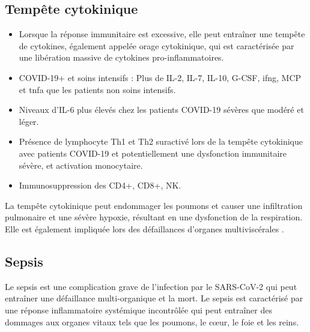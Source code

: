 \documentclass[
  a4paper,
  DIV=11,
  numbers=noendperiod,
  listof=totoc]{scrreprt}
\providecommand{\tightlist}{%
  \setlength{\itemsep}{0pt}\setlength{\parskip}{0pt}}\usepackage{longtable,booktabs,array}
\begin{document}
\subsection{Tempête cytokinique}\label{tempuxeate-cytokinique}

\begin{itemize}
\tightlist
\item
  Lorsque la réponse immunitaire est excessive, elle peut entraîner une
  tempête de cytokines, également appelée orage cytokinique, qui est
  caractérisée par une libération massive de cytokines
  pro-inflammatoires.
\item
  COVID-19+ et soins intensifs : Plus de IL-2, IL-7, IL-10, G-CSF,
  \ac{ifng}, MCP et \ac{tnfa} que les patients non soins intensifs.
\item
  Niveaux d'IL-6 plus élevés chez les patients COVID-19 sévères que
  modéré et léger.
\item
  Présence de lymphocyte Th1 et Th2 suractivé lors de la tempête
  cytokinique avec patients COVID-19 et potentiellement une dysfonction
  immunitaire sévère, et activation monocytaire.
\item
  Immunosuppression des CD4+, CD8+, NK.
\end{itemize}

La tempête cytokinique peut endommager les poumons et causer une
infiltration pulmonaire et une sévère hypoxie, résultant en une
dysfonction de la respiration. Elle est également impliquée lors des
défaillances d'organes multiviscérales \autocite{Argano.2023}.

\subsection{Sepsis}\label{sepsis}

Le sepsis est une complication grave de l'infection par le
\ac{SARS-CoV-2} qui peut entraîner une défaillance multi-organique et la
mort. Le sepsis est caractérisé par une réponse inflammatoire systémique
incontrôlée qui peut entraîner des dommages aux organes vitaux tels que
les poumons, le cœur, le foie et les reins.
\end{document}
